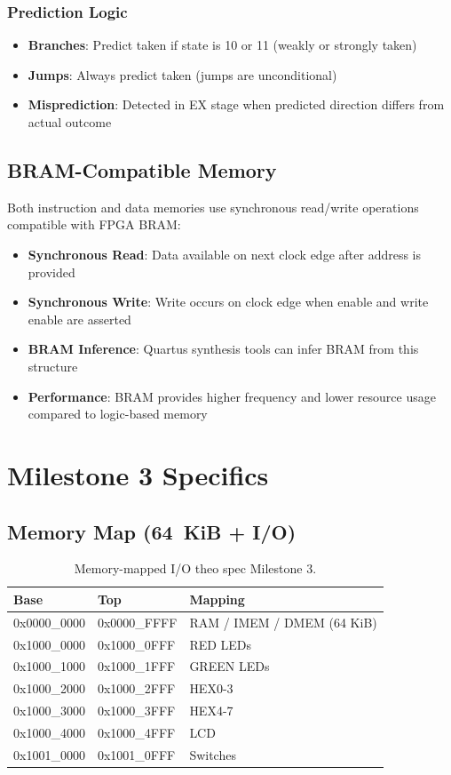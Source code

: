 \subsubsection{Prediction Logic}
\begin{itemize}
    \item \textbf{Branches}: Predict taken if state is 10 or 11 (weakly or strongly taken)
    \item \textbf{Jumps}: Always predict taken (jumps are unconditional)
    \item \textbf{Misprediction}: Detected in EX stage when predicted direction differs from actual outcome
\end{itemize}

\subsection{BRAM-Compatible Memory}

Both instruction and data memories use synchronous read/write operations compatible with FPGA BRAM:

\begin{itemize}
    \item \textbf{Synchronous Read}: Data available on next clock edge after address is provided
    \item \textbf{Synchronous Write}: Write occurs on clock edge when enable and write enable are asserted
    \item \textbf{BRAM Inference}: Quartus synthesis tools can infer BRAM from this structure
    \item \textbf{Performance}: BRAM provides higher frequency and lower resource usage compared to logic-based memory
\end{itemize}

\section{Milestone 3 Specifics}

\subsection{Memory Map (64~KiB + I/O)}
\begin{table}[ht]
\centering
\begin{tabular}{lll}
\toprule
Base & Top & Mapping \\
\midrule
0x0000\_0000 & 0x0000\_FFFF & RAM / IMEM / DMEM (64 KiB) \\
0x1000\_0000 & 0x1000\_0FFF & RED LEDs \\
0x1000\_1000 & 0x1000\_1FFF & GREEN LEDs \\
0x1000\_2000 & 0x1000\_2FFF & HEX0-3 \\
0x1000\_3000 & 0x1000\_3FFF & HEX4-7 \\
0x1000\_4000 & 0x1000\_4FFF & LCD \\
0x1001\_0000 & 0x1001\_0FFF & Switches \\
\bottomrule
\end{tabular}
\caption{Memory-mapped I/O theo spec Milestone 3.}
\end{table}

